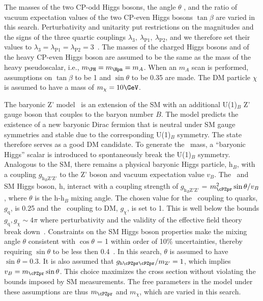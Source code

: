 The masses of the two CP-odd Higgs bosons, the angle $\theta$ , and the ratio of vacuum
expectation values of the two CP-even Higgs bosons $\tan\beta$ are varied in this search. 
Perturbativity and unitarity put restrictions on the magnitudes and the
signs of the three quartic couplings
$\lambda_3,~\lambda_{\mathrm{P}1},~\lambda_{\mathrm{P}2}$,
and we therefore set their values to $\lambda_3=\lambda_{\mathrm{P}1}=\lambda_{\mathrm{P}2}=3$~\cite{Bauer2017}. The masses of the charged Higgs bosons and of the heavy CP-even Higgs boson are assumed to be the same as the mass of the heavy pseudoscalar, i.e., $m_{\PH}=m_{\Hpm}=m_{A}$. When an $m_{A}$ scan is performed, assumptions on $\tan\beta$ to be 1 and $\sin\theta$ to be 0.35 are made. The DM particle $\chi$ is assumed to have a mass of $m_\chi=10\GeV$.


The baryonic Z' model~\cite{PhysRevD.89.075017} is an extension of the SM with an additional U(1)$_{B}$ Z' gauge 
boson that couples to the baryon number $B$. The model predicts the existence of a new baryonic Dirac fermion that is neutral under SM gauge symmetries and stable due to the corresponding U(1)$_{B}$ symmetry. The state therefore serves as a good DM candidate.
To generate the  \cPZpr\ mass, a ``baryonic Higgs'' scalar is introduced to 
spontaneously break the U(1)$_B$ symmetry. Analogous to the SM, there remains 
a physical baryonic Higgs particle, h$_{B}$, with a coupling  $g_{\mathrm{h}_{B}\mathrm{Z'Z'}}$ to the Z' boson
and vacuum expectation value $v_{B}$. 
The \cPZpr\ and SM Higgs boson, h, interact with a coupling strength of 
$g_{\mathrm{h}_{B}\mathrm{Z'Z'}}$ = $m_{\cPZpr}^{2} \sin \theta/v_{B}$, where $\theta$ is the h-h$_{B}$ 
mixing angle. The chosen value for the \cPZpr\ coupling to quarks,
$g_\text{q}$, is 0.25 and the \cPZpr\ coupling to DM, $g_\chi$, is set to 1. This is well below the bounds $g_\text{q},g_\chi\sim4\pi$ where perturbativity and the validity of the effective field theory break down~\cite{PhysRevD.89.075017}. Constraints on the SM Higgs boson properties make the mixing angle $\theta$ consistent with $\cos\theta$ = 1 within order of 10\% uncertainties, thereby requiring  $\sin\theta$ to be less then 0.4~\cite{PhysRevD.89.075017}. In this search, $\theta$ is assumed to have $\sin\theta= 0.3$. It is also assumed that $g_{\text{h}\cPZpr\cPZpr}/m_{\mathrm{Z}'}=1$, which implies $v_B=m_{\cPZpr}\sin\theta$. This choice maximizes the cross section without violating the bounds imposed by SM measurements. The free parameters in the model under these assumptions are thus $m_{\cPZpr}$ and $m_\chi$, which are varied in this search.

